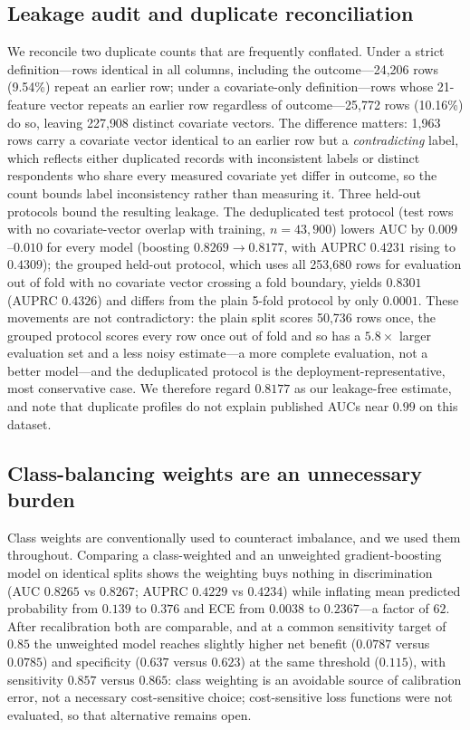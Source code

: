 \documentclass[conference]{IEEEtran}
\begin{document}
\subsection{Leakage audit and duplicate reconciliation}
We reconcile two duplicate counts that are frequently conflated. Under a strict definition---rows identical in all columns, including the outcome---24{,}206 rows (9.54\%) repeat an earlier row; under a covariate-only definition---rows whose 21-feature vector repeats an earlier row regardless of outcome---25{,}772 rows (10.16\%) do so, leaving 227{,}908 distinct covariate vectors. The difference matters: 1{,}963 rows carry a covariate vector identical to an earlier row but a \emph{contradicting} label, which reflects either duplicated records with inconsistent labels or distinct respondents who share every measured covariate yet differ in outcome, so the count bounds label inconsistency rather than measuring it. Three held-out protocols bound the resulting leakage. The deduplicated test protocol (test rows with no covariate-vector overlap with training, $n = 43{,}900$) lowers AUC by $0.009$--$0.010$ for every model (boosting $0.8269 \rightarrow 0.8177$, with AUPRC $0.4231$ rising to $0.4309$); the grouped held-out protocol, which uses all 253{,}680 rows for evaluation out of fold with no covariate vector crossing a fold boundary, yields $0.8301$ (AUPRC $0.4326$) and differs from the plain 5-fold protocol by only $0.0001$. These movements are not contradictory: the plain split scores 50{,}736 rows once, the grouped protocol scores every row once out of fold and so has a $5.8\times$ larger evaluation set and a less noisy estimate---a more complete evaluation, not a better model---and the deduplicated protocol is the deployment-representative, most conservative case. We therefore regard $0.8177$ as our leakage-free estimate, and note that duplicate profiles do not explain published AUCs near $0.99$ on this dataset.

\subsection{Class-balancing weights are an unnecessary burden}
Class weights are conventionally used to counteract imbalance, and we used them throughout. Comparing a class-weighted and an unweighted gradient-boosting model on identical splits shows the weighting buys nothing in discrimination (AUC $0.8265$ vs $0.8267$; AUPRC $0.4229$ vs $0.4234$) while inflating mean predicted probability from $0.139$ to $0.376$ and ECE from $0.0038$ to $0.2367$---a factor of $62$. After recalibration both are comparable, and at a common sensitivity target of $0.85$ the unweighted model reaches slightly higher net benefit ($0.0787$ versus $0.0785$) and specificity ($0.637$ versus $0.623$) at the same threshold ($0.115$), with sensitivity $0.857$ versus $0.865$: class weighting is an avoidable source of calibration error, not a necessary cost-sensitive choice; cost-sensitive loss functions were not evaluated, so that alternative remains open.
\end{document}
